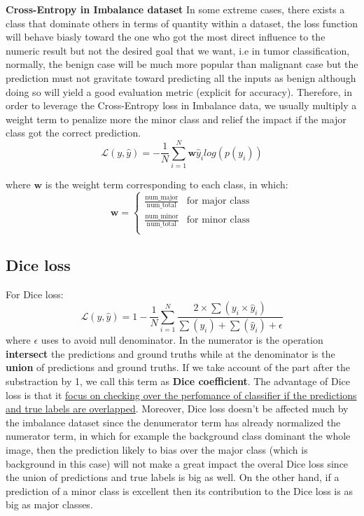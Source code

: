 \noindent
\textbf{Cross-Entropy in Imbalance dataset}\newline \noindent
In some extreme cases, there exists a class that dominate others in terms of quantity within a dataset, the loss function will behave biasly toward the one who got the most direct influence to the numeric result but not the desired goal that we want, i.e in tumor classification, normally, the benign case will be much more popular than malignant case but the prediction must not gravitate toward predicting all the inputs as benign although doing so will yield a good evaluation metric (explicit for accuracy). Therefore, in order to leverage the Cross-Entropy loss in Imbalance data, we usually multiply a weight term to penalize more the minor class and relief the impact if the major class got the correct prediction.
\begin{equation}
    \label{eq:cross}
\mathcal{L}(y,\hat{y}) = -\frac{1}{N}\sum_{i=1}^{N}\textbf{w}\hat{y}_{i}log(p(y_{i}))
\end{equation}

where $\textbf{w}$ is the weight term corresponding to each class, in which:
\begin{equation}
    \textbf{w} = 
    \begin{cases}
        \frac{\text{num\_major}}{\text{num\_total}} & \text{for major class}\\
        \frac{\text{num\_minor}}{\text{num\_total}} & \text{for minor class}\\
    \end{cases}
\end{equation}

\subsection{Dice loss}
For Dice loss:
\begin{equation}
    \label{eq:dice}
    \mathcal{L}(y,\hat{y}) = 1 - \frac{1}{N}\sum_{i=1}^{N} \frac{2\times\sum (y_{i}\times \hat{y}_{i})}{\sum(y_{i}) + \sum(\hat{y}_{i}) + \epsilon}
\end{equation}
where $\epsilon$ uses to avoid null denominator. In the numerator is the operation \textbf{intersect} the predictions and ground truths while at the denominator is the \textbf{union} of predictions and ground truths. If we take account of the part after the substraction by 1, we call this term as \textbf{Dice coefficient}. The advantage of Dice loss is that it \ul{focus on checking over the perfomance of classifier if the predictions and true labels are overlapped}. Moreover, Dice loss doesn't be affected much by the imbalance dataset since the denumerator term has already normalized the numerator term, in which for example the background class dominant the whole image, then the prediction likely to bias over the major class (which is background in this case) will not make a great impact the overal Dice loss since the union of predictions and true labels is big as well. On the other hand, if a prediction of a minor class is excellent then its contribution to the Dice loss is as big as major classes.\newline


